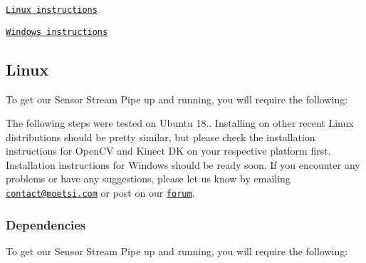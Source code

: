 \href{#linux}{\tt Linux instructions}

\href{#windows}{\tt Windows instructions}

\subsection*{Linux}

To get our Sensor Stream Pipe up and running, you will require the following\+:

The following steps were tested on Ubuntu 18.. Installing on other recent Linux distributions should be pretty similar, but please check the installation instructions for Open\+CV and Kinect DK on your respective platform first. Installation instructions for Windows should be ready soon. If you encounter any problems or have any suggestions, please let us know by emailing \href{mailto:contact@moetsi.com}{\tt contact@moetsi.\+com} or post on our \href{https://moetsi.com/pages/community}{\tt forum}.

\subsubsection*{Dependencies}

To get our Sensor Stream Pipe up and running, you will require the following\+:



